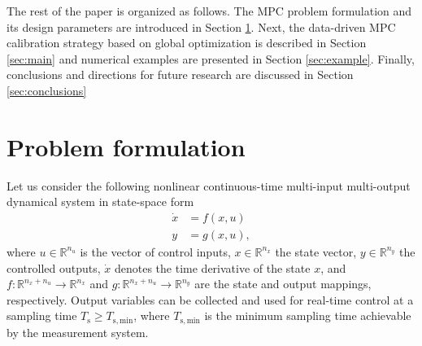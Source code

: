 \documentclass{article}
\newcommand{\Ts}{T_{\mathrm{s}}}
\newcommand{\Tsmin}{T_{\mathrm{s,min}}}
\newcommand{\nin}{n_u}
\newcommand{\nstate}{n_x}
\newcommand{\nout}{n_y}
\begin{document}
The rest of the paper is organized as follows. The MPC problem formulation and its design parameters are introduced in Section \ref{sec:problem}. Next, the data-driven MPC calibration strategy based on global optimization is described in Section \ref{sec:main} and numerical examples are presented in Section \ref{sec:example}. Finally, conclusions and directions for future research are discussed in Section \ref{sec:conclusions}

\section{Problem formulation}\label{sec:problem}

Let us consider the following nonlinear continuous-time multi-input multi-output dynamical system 
in state-space form
\begin{subequations} \label{eqn:sys}
 \begin{align}
  \dot x &= f(x,u) \\
       y &= g(x,u),
 \end{align}%
 \label{mathcalS}%
\end{subequations}
where $u\in \mathbb{R}^{\nin}$ is the vector of control inputs, $x\in \mathbb{R}^{\nstate}$
the state vector, $y\in \mathbb{R}^{\nout}$ the controlled outputs, $\dot x$ denotes the time derivative of the state $x$, and $f: \mathbb{R}^{\nstate+\nin} \to\mathbb{R}^{\nstate}$ and $g: \mathbb{R}^{\nstate+\nin} \to\mathbb{R}^{\nout}$ are the state and output mappings, respectively. 
Output variables can be collected and used for real-time control at a sampling time $\Ts \geq \Tsmin$, where $\Tsmin$ is the minimum sampling time achievable by the measurement system.
\end{document}
